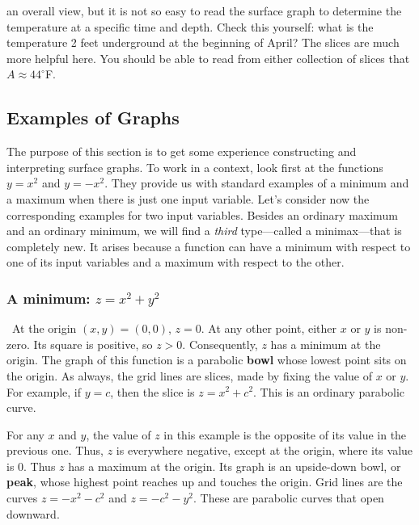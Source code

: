 {{{{\noindent
an overall view, but it is not so easy to read the surface graph to determine the temperature at a specific time and depth.   
Check this yourself: what is the temperature 2 feet underground at the beginning of April?  The slices are much more helpful here.  You should be able to read from either collection of slices that $A \approx 44^\circ$F.  

\subsection{Examples of Graphs}


	The purpose of this section is to get some experience constructing and interpreting surface graphs.  To work in a context, look first at the functions $y = x^2$ and $y = -x^2$.  They provide us with standard examples of a minimum and a maximum when there is just one input variable.  Let's consider now the corresponding examples for two input variables.  Besides an ordinary maximum and an ordinary minimum, we will find a {\em third\/} type---called a minimax---that is completely new.  It arises because a function can have a minimum with respect to one of its input variables and a maximum with respect to the other.  
	
\subsubsection{A minimum: $z = x^2 + y^2$}


\quad \	At the origin $(x, y) =(0, 0)$, $z = 0$.  At any other point, either $x$ or $y$ is non-zero. Its square is positive, so $z > 0$.  Consequently, $z$ has a minimum at the origin.  The graph of this function is a parabolic {\bf bowl} whose lowest point sits on the origin.  As always, the grid lines are slices, made by fixing the value of $x$ or $y$.  For example, if $y = c$, then the slice is $z = x^2 + c^2$.  This is an ordinary parabolic curve.

For any $x$ and $y$, the value of $z$ in this example is the opposite of its value in the previous one.  Thus, $z$ is everywhere negative, except at the origin, where its value is 0.  Thus $z$ has a maximum at the origin.  Its graph is an upside-down bowl, or {\bf peak}, whose highest point reaches up and touches the origin.  Grid lines are the curves $z = -x^2 - c^2$ and $z = -c^2 - y^2$.  These are parabolic curves that open downward.

}}}}
